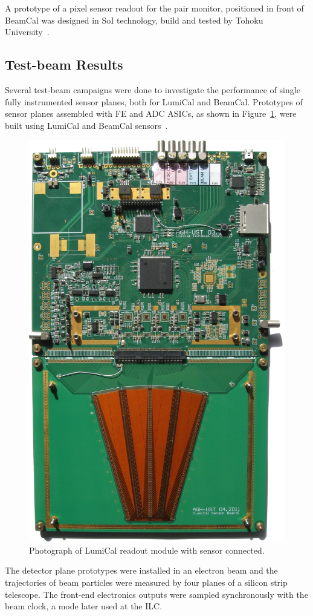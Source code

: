 A prototype of a pixel sensor readout for the pair monitor, positioned in front of BeamCal was designed in SoI
technology, build and tested
by Tohoku University~\cite{Sato201153}.


\subsection{Test-beam Results}


Several test-beam campaigns were done to investigate the performance of single fully instrumented sensor planes,
both for LumiCal and BeamCal.
Prototypes of sensor planes assembled with FE and ADC ASICs,
as shown in Figure~\ref{fig:fcal_lumical_module_photo},
were built using LumiCal and BeamCal sensors~\cite{1748-0221-7-01-T01004}.
\begin{figure}[hbp]
\centering
\includegraphics[width=0.35\columnwidth,angle=90]{Calorimeter/FCAL/figs/tb3_complete_module}
\caption{Photograph of LumiCal readout module with sensor connected.}
\label{fig:fcal_lumical_module_photo}
\end{figure}
The detector plane prototypes were installed in an electron beam and
the trajectories of beam particles were measured by four planes of a silicon strip
telescope.
The front-end electronics outputs were sampled synchronously with the
beam clock, a mode later used at the ILC.
